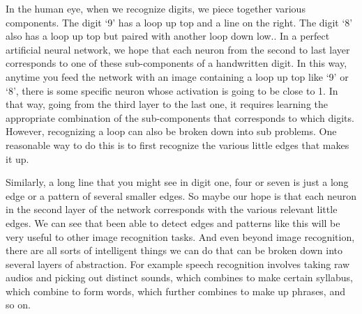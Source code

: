 \documentclass[master]{thesis-uestc}
\begin{document}
In the human eye, when we recognize digits, we piece together various components. The digit `9' has a loop up top and a line on the right. The digit `8' also has a loop up top but paired with another loop down low.. In a perfect artificial neural network, we hope that each neuron from the second to last layer corresponds to one of these sub-components of a handwritten digit. In this way, anytime you feed the network with an image containing a loop up top like `9' or `8', there is some specific neuron whose activation is going to be close to 1. In that way, going from the third layer to the last one, it requires learning the appropriate combination of the sub-components that corresponds to which digits. However, recognizing a loop can also be broken down into sub problems. One reasonable way to do this is to first recognize the various little edges that makes it up.

Similarly, a long line that you might see in digit one, four or seven is just a long edge or a pattern of several smaller edges. So maybe our hope is that each neuron in the second layer of the network corresponds with the various relevant little edges. We can see that been able to detect edges and patterns like this will be very useful to other image recognition tasks. And even beyond image recognition, there are all sorts of intelligent things we can do that can be broken down into several layers of abstraction. For example speech recognition involves taking raw audios and picking out distinct sounds, which combines to make certain syllabus, which combine to form words, which further combines to make up phrases, and so on.

\end{document}
